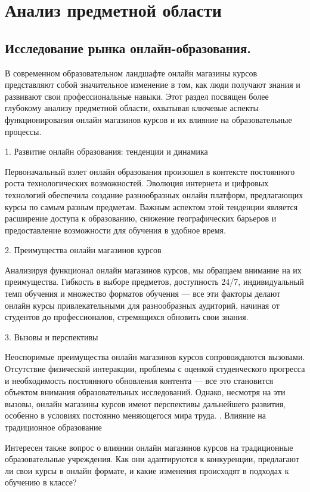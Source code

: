 \section{Анализ предметной области}
\subsection{Исследование рынка онлайн-образования.}

В современном образовательном ландшафте онлайн магазины курсов представляют собой значительное изменение в том, как люди получают знания и развивают свои профессиональные навыки. Этот раздел посвящен более глубокому анализу предметной области, охватывая ключевые аспекты функционирования онлайн магазинов курсов и их влияние на образовательные процессы.

1. Развитие онлайн образования: тенденции и динамика

Первоначальный взлет онлайн образования произошел в контексте постоянного роста технологических возможностей. Эволюция интернета и цифровых технологий обеспечила создание разнообразных онлайн платформ, предлагающих курсы по самым разным предметам. Важным аспектом этой тенденции является расширение доступа к образованию, снижение географических барьеров и предоставление возможности для обучения в удобное время.

2. Преимущества онлайн магазинов курсов

Анализируя функционал онлайн магазинов курсов, мы обращаем внимание на их преимущества. Гибкость в выборе предметов, доступность 24/7, индивидуальный темп обучения и множество форматов обучения — все эти факторы делают онлайн курсы привлекательными для разнообразных аудиторий, начиная от студентов до профессионалов, стремящихся обновить свои знания.

3. Вызовы и перспективы

Неоспоримые преимущества онлайн магазинов курсов сопровождаются вызовами. Отсутствие физической интеракции, проблемы с оценкой студенческого прогресса и необходимость постоянного обновления контента — все это становится объектом внимания образовательных исследований. Однако, несмотря на эти вызовы, онлайн магазины курсов имеют перспективы дальнейшего развития, особенно в условиях постоянно меняющегося мира труда.
. Влияние на традиционное образование

Интересен также вопрос о влиянии онлайн магазинов курсов на традиционные образовательные учреждения. Как они адаптируются к конкуренции, предлагают ли свои курсы в онлайн формате, и какие изменения происходят в подходах к обучению в классе?

